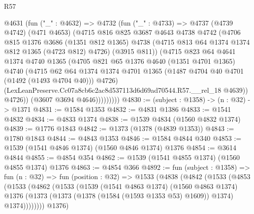 \begin{lexlean}{R57}
\begin{coremodule}
              @4631
                (fun ("_" : @4632) =>
                @4732
                  (fun ("_" : @4733) =>
                  @4737
                    (@4739 @4742)
                    (@471 @4653)
                    (@4715
                      @816
                      @825
                      @3687
                      @4643
                      @4738
                      @4742
                      (@4706
                        @815
                        @1376
                        @3686
                        (@1351 @812 @1365)
                        @4738
                        (@4715 @813 @64 @1374 @1374 @812 @1365 (@4723 @812) @4726)
                        (@3915 @811))
                      (@4715
                        @823
                        @64
                        @4641
                        @1374
                        @4740
                        @1365
                        (@4705
                          @821
                          @65
                          @1376
                          @4640
                          (@1351 @4701 @1365)
                          @4740
                          (@4715
                            @62
                            @64
                            @1374
                            @1374
                            @4701
                            @1365
                            (@1487 @4704 @40 @4701 (@1492 (@1493 @4704 @40)))
                            @4726)
                          (LexLeanPreserve.Cc07a8cb6c2ac8d537113d6d69ad70544.R57.__rel_18 @4639))
                        @4726))
                    (@3607 @3694 @4646)))))))))
@4830 := (subject : @1358) -> (n : @32) -> @1371
@4831 := @1584 @1353
@4832 := @4831 @1386
@4833 := @1541 @4832
@4834 := @4833 @1374
@4838 := @1539 @4834 (@1560 @4832 @1374)
@4839 := @1776 @1843
@4842 := @1373 (@1378 (@4839 @1353))
@4843 := @1780 @1843
@4844 := @4843 @1353
@4846 := @1584 @4844 @340
@4853 := @1539 (@1541 @4846 @1374) (@1560 @4846 @1374) @1376
@4854 := @3614 @4844
@4855 := @4854 @354
@4862 := @1539 (@1541 @4855 @1374) (@1560 @4855 @1374) @1376
@4863 := @4854 @366
@4892 := fun (subject : @1358) =>
  fun (n : @32) =>
  fun (position : @32) =>
  @1533
    (@4838
      (@4842
        (@1533
          (@4853
            (@1533
              (@4862
                (@1533
                  (@1539
                    (@1541 @4863 @1374)
                    (@1560 @4863 @1374)
                    @1376
                    (@1373 (@1373 (@1378 (@1584 (@1593 @1353 @53) @1609)) @1374) @1374))))))))
      @1376)

\end{coremodule}
\end{lexlean}
